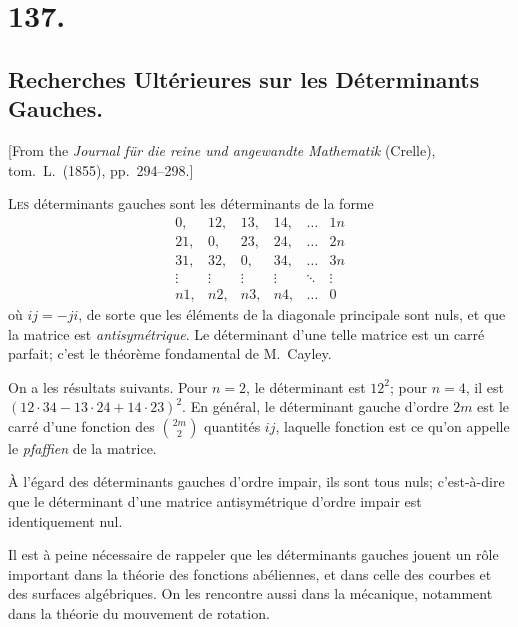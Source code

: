 \documentclass[11pt,a4paper]{book}
\begin{document}
\section*{137.}
\subsection*{Recherches Ult\'erieures sur les D\'eterminants Gauches.}

[From the \textit{Journal f\"ur die reine und angewandte Mathematik} (Crelle),
tom.\ L.\ (1855), pp.\ 294--298.]

\medskip

\textsc{Les} d\'eterminants gauches sont les d\'eterminants de la forme
\[
\begin{array}{|cccccc|}
0, & 12, & 13, & 14, & \ldots & 1n \\
21, & 0, & 23, & 24, & \ldots & 2n \\
31, & 32, & 0, & 34, & \ldots & 3n \\
\vdots & \vdots & \vdots & \vdots & \ddots & \vdots \\
n1, & n2, & n3, & n4, & \ldots & 0
\end{array}
\]
o\`u $ij = -ji$, de sorte que les \'el\'ements de la diagonale principale
sont nuls, et que la matrice est \textit{antisym\'etrique}. Le d\'eterminant
d'une telle matrice est un carr\'e parfait; c'est le th\'eor\`eme fondamental
de M.~Cayley.

\medskip

On a les r\'esultats suivants. Pour $n = 2$, le d\'eterminant est $12^2$;
pour $n = 4$, il est $(12\cdot 34 - 13\cdot 24 + 14\cdot 23)^2$. En
g\'en\'eral, le d\'eterminant gauche d'ordre $2m$ est le carr\'e d'une
fonction des $\binom{2m}{2}$ quantit\'es $ij$, laquelle fonction est ce
qu'on appelle le \textit{pfaffien} de la matrice.

\medskip

\`A l'\'egard des d\'eterminants gauches d'ordre impair, ils sont tous
nuls; c'est-\`a-dire que le d\'eterminant d'une matrice antisym\'etrique
d'ordre impair est identiquement nul.

\medskip

Il est \`a peine n\'ecessaire de rappeler que les d\'eterminants gauches
jouent un r\^ole important dans la th\'eorie des fonctions ab\'eliennes,
et dans celle des courbes et des surfaces alg\'ebriques. On les rencontre
aussi dans la m\'ecanique, notamment dans la th\'eorie du mouvement de
rotation.
\end{document}
